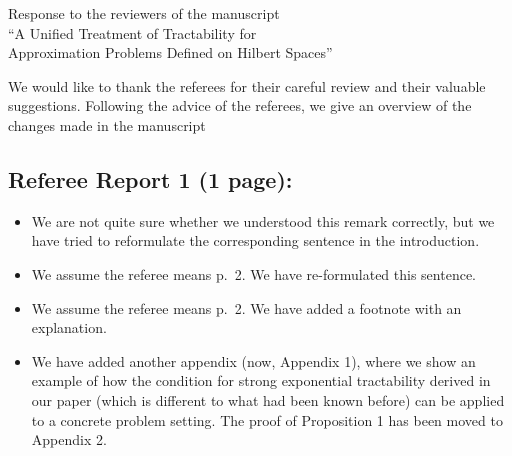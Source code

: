 \documentclass[11pt,a4paper]{article}
\begin{document}
\newtheorem{theorem}{Theorem}
\theoremstyle{definition}
\newtheorem{definition}{Definition}


\begin{center}
    {\Large Response to the reviewers of the manuscript\\``A Unified Treatment of Tractability for \\ Approximation Problems Defined on Hilbert Spaces''}
\end{center}

We would like to thank the referees for their careful review and their valuable suggestions. Following the advice of the referees, we give an overview of the changes made in the manuscript

\subsection*{Referee Report 1 (1 page):}
\begin{itemize}
    \item We are not quite sure whether we understood this remark correctly, but we have tried to reformulate the corresponding sentence in the introduction. 
    \item We assume the referee means p.~2. We have re-formulated this sentence. 
    \item We assume the referee means p.~2. We have added a footnote with an explanation. 
    \item We have added another appendix (now, Appendix 1), where we show an example of how the condition for strong exponential tractability derived in our paper (which is different to what had been known before) can be applied to a concrete problem setting. The proof of Proposition 1 has been moved to Appendix 2. 
\end{itemize}
\medskip
\end{document}
